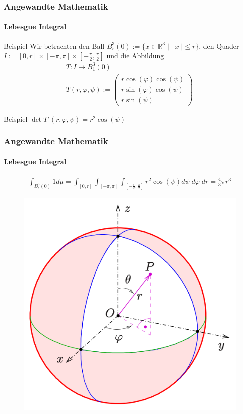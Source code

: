 \documentclass{beamer}
\begin{document}
\begin{frame}
    \frametitle{Angewandte Mathematik}
\framesubtitle{Lebesgue Integral}
\begin{block}{Beispiel}
Wir betrachten den Ball $B_r^3(0):= \{ x \in \mathbb{R}^3 \; | \; || x || \leq r  \}$, den Quader $I := [0,r] \times [- \pi, \pi] \times [- \frac{\pi}{2}, \frac{\pi}{2}]$ und die Abbildung
\begin{align*}
T : I \to B_1^3(0) \\
T(r, \varphi, \psi) := \begin{pmatrix} r \cos(\varphi) \cos(\psi)   \\  r \sin(\varphi) \cos(\psi) \\ r  \sin(\psi)     \end{pmatrix}
\end{align*}
\end{block}
\begin{block}{Beispiel}
$\det T'(r, \varphi, \psi) = r^2 \cos(\psi)$
\end{block}
 \end{frame}

\begin{frame}
    \frametitle{Angewandte Mathematik}
\framesubtitle{Lebesgue Integral}
\begin{align*}
\int_{B_r^3(0)} 1 d\mu = \int_{ [0,r] } \int_{ [- \pi, \pi]} \int_{[- \frac{\pi}{2}, \frac{\pi}{2}]} r^2 \cos(\psi) d \psi \; d \varphi \; dr = \frac{4} {3} \pi r^3
\end{align*}
\begin{figure}[H]
      \centering
    \includegraphics[width=0.4 \textwidth]{img/500px-Kugelkoord-def}    
\end{figure}
 \end{frame}
\end{document}
